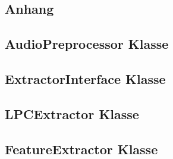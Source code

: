 \begin{appendix}
  \section{Anhang}
  \subsection{AudioPreprocessor Klasse}
  

  \subsection{ExtractorInterface Klasse}
  

  \subsection{LPCExtractor Klasse}
  

  \subsection{FeatureExtractor Klasse}
  
\end{appendix}